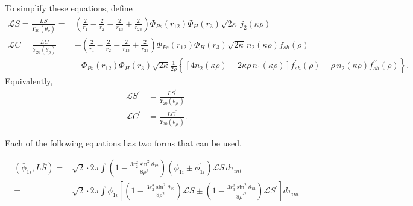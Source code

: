 \documentclass[Dissertation.tex]{subfiles}
\begin{document}
To simplify these equations, define
\begin{align}
\nonumber \mathscr{L} S = \frac{L S}{Y_{20}(\theta_\rho)} = & \left(\frac{2}{r_1} - \frac{2}{r_2} - \frac{2}{r_{13}} + \frac{2}{r_{23}} \right) \Phi_{Ps}(r_{12}) \Phi_H(r_3) \sqrt{2\kappa} \, j_2(\kappa\rho) \\
\nonumber \mathscr{L} C = \frac{L C}{Y_{20}(\theta_\rho)} = & - \left(\frac{2}{r_1} - \frac{2}{r_2} - \frac{2}{r_{13}} + \frac{2}{r_{23}} \right) \Phi_{Ps}(r_{12}) \Phi_H(r_3) \sqrt{2\kappa} \, n_2(\kappa\rho) f_{sh}(\rho) \\
& - \Phi_{Ps}(r_{12}) \Phi_H(r_3) \sqrt{2\kappa} \frac{1}{2\rho} \left\{ \left[4 n_2(\kappa\rho) - 2 \kappa\rho \, n_1(\kappa\rho) \right] f_{sh}^\prime(\rho) - \rho \, n_2(\kappa\rho) f_{sh}^{\prime\prime}(\rho) \right\}.
\end{align}
Equivalently,
\begin{align}
\mathscr{L} S^\prime &= \frac{L S^\prime}{Y_{20}(\theta_{\rho^\prime})} \\
\mathscr{L} C^\prime &= \frac{L C^\prime}{Y_{20}(\theta_{\rho^\prime})}.
\end{align}

Each of the following equations has two forms that can be used.


\begin{align}
\label{eq:DWavePhi1SBar}
\nonumber \left(\bar{\phi}_{1i},L \bar{S}\right) = & \sqrt{2} \cdot 2\pi \int \left(1 - \frac{3 r_2^2 \sin^2\theta_{12}}{8 \rho^2} \right) \left(\phi_{1i} \pm \phi_{1i}^\prime \right) \mathscr{L}S \, d\tau_{int} \\
=& \sqrt{2} \cdot 2\pi \int \phi_{1i} \left[ \left(1 - \frac{3 r_2^2 \sin^2\theta_{12}}{8 \rho^2} \right) \mathscr{L}S \pm \left(1 - \frac{3 r_3^2 \sin^2\theta_{13}}{8 {\rho^\prime}^2} \right) \mathscr{L}S^\prime \right] d\tau_{int}
\end{align}
\end{document}
